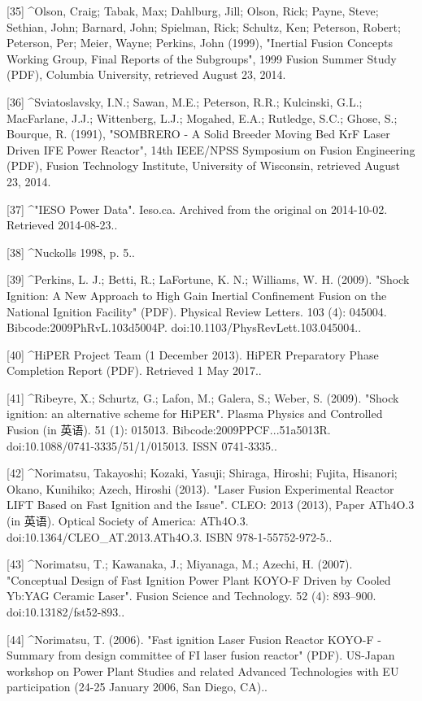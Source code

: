 [35]
^Olson, Craig; Tabak, Max; Dahlburg, Jill; Olson, Rick; Payne, Steve; Sethian, John; Barnard, John; Spielman, Rick; Schultz, Ken; Peterson, Robert; Peterson, Per; Meier, Wayne; Perkins, John (1999), "Inertial Fusion Concepts Working Group, Final Reports of the Subgroups", 1999 Fusion Summer Study (PDF), Columbia University, retrieved August 23, 2014.

[36]
^Sviatoslavsky, I.N.; Sawan, M.E.; Peterson, R.R.; Kulcinski, G.L.; MacFarlane, J.J.; Wittenberg, L.J.; Mogahed, E.A.; Rutledge, S.C.; Ghose, S.; Bourque, R. (1991), "SOMBRERO - A Solid Breeder Moving Bed KrF Laser Driven IFE Power Reactor", 14th IEEE/NPSS Symposium on Fusion Engineering (PDF), Fusion Technology Institute, University of Wisconsin, retrieved August 23, 2014.

[37]
^"IESO Power Data". Ieso.ca. Archived from the original on 2014-10-02. Retrieved 2014-08-23..

[38]
^Nuckolls 1998, p. 5..

[39]
^Perkins, L. J.; Betti, R.; LaFortune, K. N.; Williams, W. H. (2009). "Shock Ignition: A New Approach to High Gain Inertial Confinement Fusion on the National Ignition Facility" (PDF). Physical Review Letters. 103 (4): 045004. Bibcode:2009PhRvL.103d5004P. doi:10.1103/PhysRevLett.103.045004..

[40]
^HiPER Project Team (1 December 2013). HiPER Preparatory Phase Completion Report (PDF). Retrieved 1 May 2017..

[41]
^Ribeyre, X.; Schurtz, G.; Lafon, M.; Galera, S.; Weber, S. (2009). "Shock ignition: an alternative scheme for HiPER". Plasma Physics and Controlled Fusion (in 英语). 51 (1): 015013. Bibcode:2009PPCF...51a5013R. doi:10.1088/0741-3335/51/1/015013. ISSN 0741-3335..

[42]
^Norimatsu, Takayoshi; Kozaki, Yasuji; Shiraga, Hiroshi; Fujita, Hisanori; Okano, Kunihiko; Azech, Hiroshi (2013). "Laser Fusion Experimental Reactor LIFT Based on Fast Ignition and the Issue". CLEO: 2013 (2013), Paper ATh4O.3 (in 英语). Optical Society of America: ATh4O.3. doi:10.1364/CLEO_AT.2013.ATh4O.3. ISBN 978-1-55752-972-5..

[43]
^Norimatsu, T.; Kawanaka, J.; Miyanaga, M.; Azechi, H. (2007). "Conceptual Design of Fast Ignition Power Plant KOYO-F Driven by Cooled Yb:YAG Ceramic Laser". Fusion Science and Technology. 52 (4): 893–900. doi:10.13182/fst52-893..

[44]
^Norimatsu, T. (2006). "Fast ignition Laser Fusion Reactor KOYO-F - Summary from design committee of FI laser fusion reactor" (PDF). US-Japan workshop on Power Plant Studies and related Advanced Technologies with EU participation (24-25 January 2006, San Diego, CA)..

